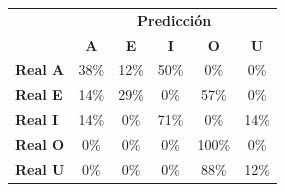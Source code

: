 \begin{tabular}{lccccc}
\toprule
 & \multicolumn{5}{c}{\textbf{Predicción}} \\
 & \textbf{A} & \textbf{E} & \textbf{I} & \textbf{O} & \textbf{U} \\
\midrule
\textbf{Real A} & \cellcolor[rgb]{0.74,0.74,1.00}  38\% & \cellcolor[rgb]{0.91,0.91,1.00}  12\% & \cellcolor[rgb]{0.65,0.65,1.00} \color{white} 50\% & \cellcolor[rgb]{1.00,1.00,1.00}  0\% & \cellcolor[rgb]{1.00,1.00,1.00}  0\% \\
\textbf{Real E} & \cellcolor[rgb]{0.90,0.90,1.00}  14\% & \cellcolor[rgb]{0.80,0.80,1.00}  29\% & \cellcolor[rgb]{1.00,1.00,1.00}  0\% & \cellcolor[rgb]{0.60,0.60,1.00} \color{white} 57\% & \cellcolor[rgb]{1.00,1.00,1.00}  0\% \\
\textbf{Real I} & \cellcolor[rgb]{0.90,0.90,1.00}  14\% & \cellcolor[rgb]{1.00,1.00,1.00}  0\% & \cellcolor[rgb]{0.50,0.50,1.00} \color{white} 71\% & \cellcolor[rgb]{1.00,1.00,1.00}  0\% & \cellcolor[rgb]{0.90,0.90,1.00}  14\% \\
\textbf{Real O} & \cellcolor[rgb]{1.00,1.00,1.00}  0\% & \cellcolor[rgb]{1.00,1.00,1.00}  0\% & \cellcolor[rgb]{1.00,1.00,1.00}  0\% & \cellcolor[rgb]{0.30,0.30,1.00} \color{white} 100\% & \cellcolor[rgb]{1.00,1.00,1.00}  0\% \\
\textbf{Real U} & \cellcolor[rgb]{1.00,1.00,1.00}  0\% & \cellcolor[rgb]{1.00,1.00,1.00}  0\% & \cellcolor[rgb]{1.00,1.00,1.00}  0\% & \cellcolor[rgb]{0.39,0.39,1.00} \color{white} 88\% & \cellcolor[rgb]{0.91,0.91,1.00}  12\% \\
\bottomrule
\end{tabular}